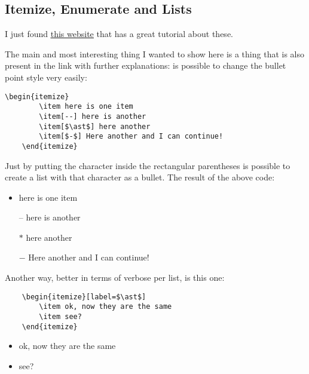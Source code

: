 





\subsection{Itemize, Enumerate and Lists}
\par I just found \href{https://www.latex-tutorial.com/tutorials/lists/}{\ul{this website}} that has a great tutorial about these. 
\par The main and most interesting thing I wanted to show here is a thing that is also present in the link with further explanations: is possible to change the bullet point style very easily:

\begin{lstlisting}[language=Tex]
    \begin{itemize}
        \item here is one item
        \item[--] here is another
        \item[$\ast$] here another
        \item[$-$] Here another and I can continue!
    \end{itemize}
\end{lstlisting}

Just by putting the character inside the rectangular parentheses is possible to create a list with that character as a bullet. The result of the above code:
\begin{itemize}
    \item here is one item
    \item[--] here is another
    \item[$\ast$] here another
    \item[$-$] Here another and I can continue!
\end{itemize}

\par Another way, better in terms of verbose per list, is this one:
\begin{lstlisting}[language=Tex]
    %requires \usepackage{enumitem}
    \begin{itemize}[label=$\ast$]
        \item ok, now they are the same
        \item see?
    \end{itemize}
\end{lstlisting}
\begin{itemize}[label=$\ast$]
    \item ok, now they are the same
    \item see?
\end{itemize}




